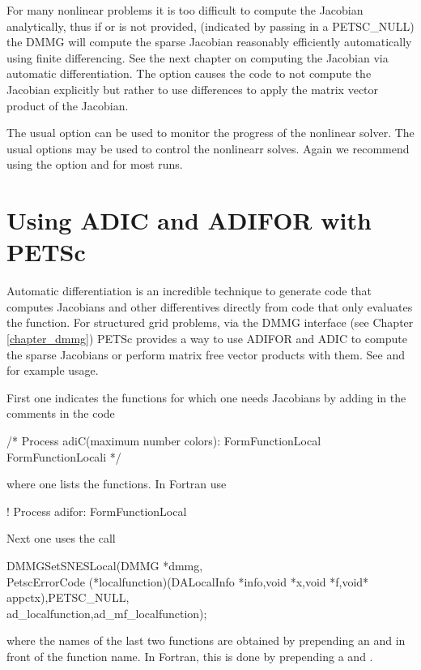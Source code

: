 For many nonlinear problems it is too difficult to compute the
Jacobian analytically, thus if  or  is not
provided, (indicated by passing in a PETSC_NULL) the DMMG will compute the
sparse Jacobian reasonably efficiently automatically using finite
differencing. See the next chapter on computing the Jacobian via
automatic differentiation. The option 
causes the code to not compute the Jacobian explicitly but rather to
use differences to apply the matrix vector product of the Jacobian.

The usual option   can
be used to monitor the progress of the nonlinear solver. The usual  options
may be used to control the nonlinearr solves. Again we recommend using the 
option  and  for most runs.


\cleardoublepage
\chapter{Using ADIC and ADIFOR with PETSc}

Automatic differentiation is an incredible technique to generate code
that computes Jacobians and other differentives directly from code
that only evaluates the function. For structured grid problems, via
the DMMG interface (see Chapter \ref{chapter_dmmg}) PETSc provides a way to use
ADIFOR and ADIC to compute the sparse Jacobians or perform matrix free
vector products with them. See
 and  for example
usage. 

First one indicates the functions for which one needs Jacobians by adding
in the comments in the code 
\begin{tabbing}
       /* Process adiC(maximum number colors): FormFunctionLocal FormFunctionLocali */
\end{tabbing}
where one lists the functions. In Fortran use
\begin{tabbing}
!     Process adifor: FormFunctionLocal
\end{tabbing}
Next one uses the call
\begin{tabbing}
  DMMGSetSNESLocal(DMMG *dmmg,\\
   PetscErrorCode (*localfunction)(DALocalInfo *info,void *x,void *f,void* appctx),PETSC_NULL,\\
  ad\_localfunction,ad\_mf\_localfunction);
\end{tabbing}
where the names of the last two functions are obtained 
by prepending an  and  in front
of the function name. In Fortran, this is done by prepending a  and .

